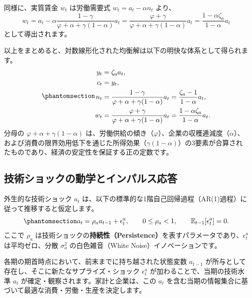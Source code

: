 \documentclass[
  japanese,
  lualatex,
  ja=standard,
  12pt,
  a4paper]{ltjsarticle}
\begin{document}
同様に、実質賃金 \(w_t\) は労働需要式 \(w_t = a_t - \alpha n_t\) より、
\[
w_t = a_t - \alpha \frac{1-\gamma}{\varphi + \alpha + \gamma(1-\alpha)} a_t = \frac{\varphi + \gamma}{\varphi + \alpha + \gamma(1-\alpha)} a_t = \frac{1 - \alpha \zeta_a}{1-\alpha} a_t
\] として導出されます。

以上をまとめると、対数線形化された均衡解は以下の明快な体系として得られます。
\begin{equation}\protect\phantomsection\label{eq-loglinear-solution}{
\begin{aligned}
y_t &= \zeta_a a_t,\\
c_t &= y_t,\\
n_t &= \frac{1-\gamma}{\varphi + \alpha + \gamma(1-\alpha)} a_t = \frac{\zeta_a - 1}{1-\alpha} a_t,\\
w_t &= \frac{\varphi + \gamma}{\varphi + \alpha + \gamma(1-\alpha)} a_t = \frac{1-\alpha\zeta_a}{1-\alpha} a_t.
\end{aligned}
}\end{equation} 分母の \(\varphi + \alpha + \gamma(1-\alpha)\)
は、労働供給の傾き（\(\varphi\)）、企業の収穫逓減度（\(\alpha\)）、および消費の限界効用低下を通じた所得効果（\(\gamma(1-\alpha)\)）の3要素が合算されたものであり、経済の安定性を保証する正の定数です。

\subsection{技術ショックの動学とインパルス応答}\label{ux6280ux8853ux30b7ux30e7ux30c3ux30afux306eux52d5ux5b66ux3068ux30a4ux30f3ux30d1ux30ebux30b9ux5fdcux7b54}

外生的な技術ショック \(a_t\)
は、以下の標準的な1階自己回帰過程（AR(1)過程）に従って推移すると仮定します。
\begin{equation}\protect\phantomsection\label{eq-technology-process}{
a_t = \rho_a a_{t-1} + \epsilon_t^a, \qquad 0 \leq \rho_a < 1, \qquad \mathbb{E}_{t-1}[\epsilon_t^a] = 0.
}\end{equation} ここで \(\rho_a\)
は技術ショックの\textbf{持続性（Persistence）}を表すパラメータであり、\(\epsilon_t^a\)
は平均ゼロ、分散 \(\sigma_a^2\) の白色雑音（White
Noise）イノベーションです。

各期の期首時点において、前末までに持ち越された状態変数 \(a_{t-1}\)
が所与として存在し、そこに新たなサプライズ・ショック \(\epsilon_t^a\)
が加わることで、当期の技術水準 \(a_t\)
が確定・観察されます。家計と企業は、この \(a_t\)
を含む当期の情報集合に基づいて最適な消費・労働・生産を決定します。
\end{document}

